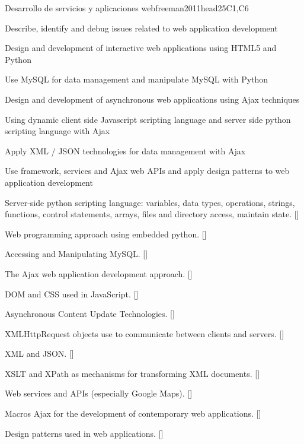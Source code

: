 \begin{syllabus}
\begin{unit}{Desarrollo de servicios y aplicaciones web}{}{freeman2011head}{25}{C1,C6}
   \begin{topics}
    \item Describe, identify and debug issues related to web application development
    \item Design and development of interactive web applications using HTML5 and Python
    \item Use MySQL for data management and manipulate MySQL with Python
    \item Design and development of asynchronous web applications using Ajax techniques
    \item Using dynamic client side Javascript scripting language and server side python scripting language with Ajax
    \item Apply XML / JSON technologies for data management with Ajax
    \item Use framework, services and Ajax web APIs and apply design patterns to web application development
   \end{topics}
   \begin{learningoutcomes}
      \item Server-side python scripting language: variables, data types, operations, strings, functions, control statements, arrays, files and directory access, maintain state. [\Usage]
      \item Web programming approach using embedded python. [\Usage]
      \item Accessing and Manipulating MySQL. [\Usage]
      \item The Ajax web application development approach. [\Usage]
      \item DOM and CSS used in JavaScript. [\Usage]
      \item Asynchronous Content Update Technologies. [\Usage]
      \item XMLHttpRequest objects use to communicate between clients and servers. [\Usage]
      \item XML and JSON. [\Usage]
      \item XSLT and XPath as mechanisms for transforming XML documents. [\Usage]
      \item Web services and APIs (especially Google Maps). [\Usage]
      \item Macros Ajax  for the development of contemporary web applications. [\Usage]
      \item Design patterns used in web applications. [\Usage]
   \end{learningoutcomes}
\end{unit}


\end{syllabus}

